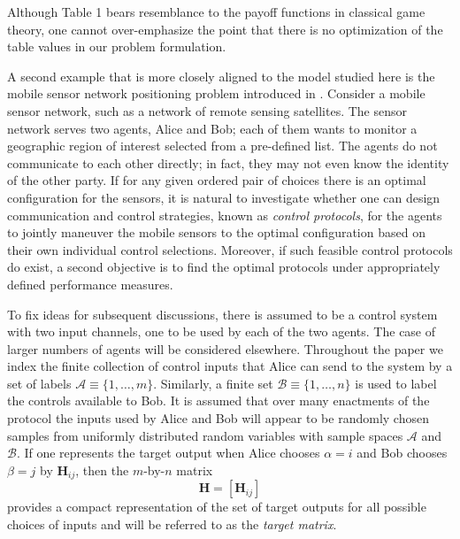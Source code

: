 \documentclass[12pt,onecolumn,draftcls]{IEEEtran}
\newcommand{\bH}{\mathbf{H}}
\newcommand{\cA}{\mathcal{A}}
\newcommand{\cB}{\mathcal{B}}
\begin{document}
Although Table 1 bears resemblance to the payoff functions in classical game theory, one cannot over-emphasize the point that there is no optimization of the table values in our problem formulation.

A second example that is more closely aligned to the model studied here is the mobile sensor network positioning problem introduced in \cite{Wong}.
Consider a mobile sensor network, such as a network of remote sensing satellites.  The sensor
network serves two agents, Alice and Bob; each of them wants to monitor a geographic region
of interest selected from a pre-defined list.   The agents do not communicate to each other directly;
in fact, they may not even know the identity of the other party.   If for any given ordered pair of choices there is an optimal configuration for the sensors, it is natural to investigate whether one can design communication and control strategies, known as {\em control protocols}, for the agents to jointly maneuver the mobile sensors to the optimal configuration based on their own individual control selections.   Moreover, if such feasible control protocols do exist, a second objective is to find the optimal protocols under appropriately defined performance measures.

To fix ideas for subsequent discussions, there is assumed to be a control system with two input channels, one to be used by each of the two agents. 
The case of larger numbers of agents will be considered elsewhere.
Throughout the paper we index the finite collection of control inputs that Alice can send to the system by a set of labels $\cA \equiv \{1, \ldots, m \}$.  Similarly, a finite set $\cB \equiv \{1, \ldots, n \}$ is used to label the controls available to Bob.  It is assumed that  over many enactments of the protocol the inputs used by Alice and Bob will appear to be randomly chosen samples from uniformly distributed random variables with sample spaces $\cA$ and $\cB$.   If one represents the target output when Alice chooses $\alpha=i$ and Bob chooses  $\beta=j$ by $\bH_{ij}$, then the $m$-by-$n$ matrix
\begin{equation}
\bH=\left[ \bH_{ij} \right]
\end{equation}
provides a compact representation of the set of target outputs for all possible choices of inputs and will be referred to as the
{\em target matrix}.
\end{document}
